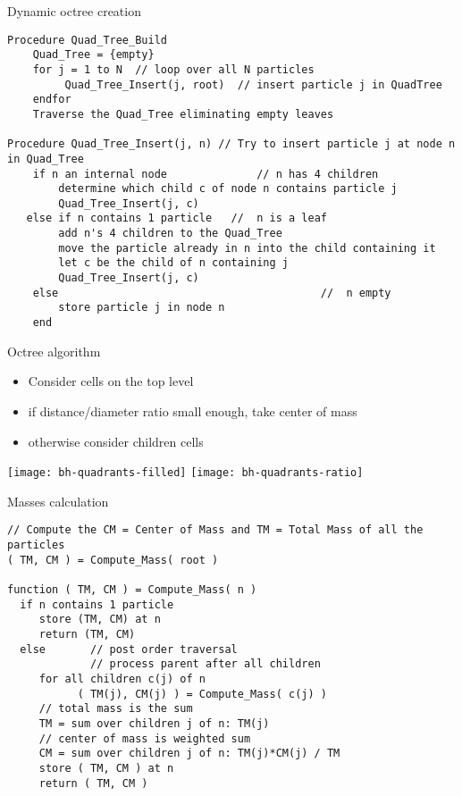 \begin{frame}[fragile]{Dynamic octree creation}
\small
\begin{verbatim}
Procedure Quad_Tree_Build
    Quad_Tree = {empty}
    for j = 1 to N  // loop over all N particles
         Quad_Tree_Insert(j, root)  // insert particle j in QuadTree
    endfor
    Traverse the Quad_Tree eliminating empty leaves

Procedure Quad_Tree_Insert(j, n) // Try to insert particle j at node n in Quad_Tree
    if n an internal node              // n has 4 children
        determine which child c of node n contains particle j
        Quad_Tree_Insert(j, c)
   else if n contains 1 particle   //  n is a leaf
        add n's 4 children to the Quad_Tree
        move the particle already in n into the child containing it
        let c be the child of n containing j
        Quad_Tree_Insert(j, c)
    else                                         //  n empty 
        store particle j in node n
    end
\end{verbatim}
\end{frame}

\begin{frame}{Octree algorithm}
  \begin{itemize}
  \item Consider cells on the top level
  \item if distance/diameter ratio small enough, take center of mass
  \item otherwise consider children cells
  \end{itemize}
\end{frame}

\begin{frame}
  \texttt{[image: bh-quadrants-filled]}
  \texttt{[image: bh-quadrants-ratio]}
\end{frame}

\begin{frame}[fragile]{Masses calculation}
\small
\begin{verbatim}
// Compute the CM = Center of Mass and TM = Total Mass of all the particles 
( TM, CM ) = Compute_Mass( root )

function ( TM, CM ) = Compute_Mass( n )
  if n contains 1 particle
     store (TM, CM) at n
     return (TM, CM)
  else       // post order traversal
             // process parent after all children
     for all children c(j) of n
           ( TM(j), CM(j) ) = Compute_Mass( c(j) )
     // total mass is the sum
     TM = sum over children j of n: TM(j)
     // center of mass is weighted sum
     CM = sum over children j of n: TM(j)*CM(j) / TM
     store ( TM, CM ) at n
     return ( TM, CM )
\end{verbatim}
\end{frame}

